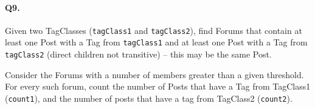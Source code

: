 \paragraph{Q9.}

Given two TagClasses (\texttt{tagClass1} and \texttt{tagClass2}), find
Forums that contain at least one Post with a Tag from \texttt{tagClass1}
and at least one Post with a Tag from \texttt{tagClass2} (direct
children not transitive) -- this may be the same Post.

Consider the Forums with a number of members greater than a given
threshold. For every such forum, count the number of Posts that have a
Tag from TagClass1 (\texttt{count1}), and the number of posts that have
a tag from TagClass2 (\texttt{count2}).
